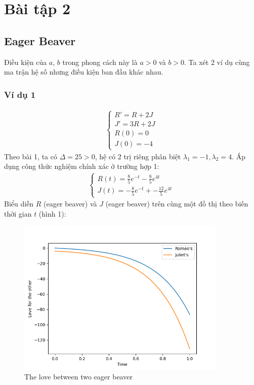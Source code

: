 \section{Bài tập 2}
\subsection{Eager Beaver}
Điều kiện của $a$, $b$ trong phong cách này là $a>0$ và $b>0$. Ta xét 2 ví dụ cùng ma trận hệ số nhưng điều kiện ban đầu khác nhau.
\subsubsection{Ví dụ 1}
\begin{align*}
    \begin{cases}
        R'=R+2J\\
        J'=3R+2J\\
        R(0)=0\\
        J(0)=-4
    \end{cases}
\end{align*}
Theo bài 1, ta có $\Delta=25>0$, hệ có 2 trị riêng phân biệt $\lambda_1=-1, \lambda_2=4$. Áp dụng công thức nghiệm chính xác ở trường hợp 1:
\begin{align*}
    \begin{cases}
        R(t)=\frac{8}{5}e^{-t}-\frac{8}{5}e^{4t}\\
        J(t)=-\frac{8}{5}e^{-t}+-\frac{12}{5}e^{4t}
    \end{cases}
\end{align*}
Biểu diễn $R$ (eager beaver) và $J$ (eager beaver) trên cùng một đồ thị theo biến thời gian $t$ (hình 1):
\begin{figure}[h!]
    \begin{center}
    \includegraphics[width=10cm]{images/eager_beaver_1.png}
    \end{center}
    \caption{The love between two eager beaver}
\end{figure}\\
